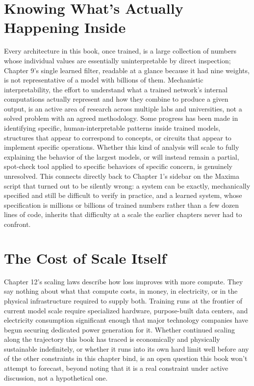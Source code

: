 \section*{Knowing What's Actually Happening Inside}

Every architecture in this book, once trained, is a large collection of numbers whose individual values are essentially uninterpretable by direct inspection; Chapter 9's single learned filter, readable at a glance because it had nine weights, is not representative of a model with billions of them. Mechanistic interpretability, the effort to understand what a trained network's internal computations actually represent and how they combine to produce a given output, is an active area of research across multiple labs and universities, not a solved problem with an agreed methodology. Some progress has been made in identifying specific, human-interpretable patterns inside trained models, structures that appear to correspond to concepts, or circuits that appear to implement specific operations. Whether this kind of analysis will scale to fully explaining the behavior of the largest models, or will instead remain a partial, spot-check tool applied to specific behaviors of specific concern, is genuinely unresolved. This connects directly back to Chapter 1's sidebar on the Maxima script that turned out to be silently wrong: a system can be exactly, mechanically specified and still be difficult to verify in practice, and a learned system, whose specification is millions or billions of trained numbers rather than a few dozen lines of code, inherits that difficulty at a scale the earlier chapters never had to confront.

\section*{The Cost of Scale Itself}

Chapter 12's scaling laws describe how loss improves with more compute. They say nothing about what that compute costs, in money, in electricity, or in the physical infrastructure required to supply both. Training runs at the frontier of current model scale require specialized hardware, purpose-built data centers, and electricity consumption significant enough that major technology companies have begun securing dedicated power generation for it. Whether continued scaling along the trajectory this book has traced is economically and physically sustainable indefinitely, or whether it runs into its own hard limit well before any of the other constraints in this chapter bind, is an open question this book won't attempt to forecast, beyond noting that it is a real constraint under active discussion, not a hypothetical one.

